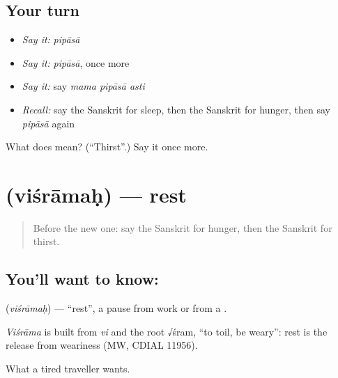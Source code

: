 \subsection*{Your turn}
\begin{itemize}
\raggedright
  \item \emph{Say it:} \emph{pipāsā}
  \item \emph{Say it:} \emph{pipāsā}, once more
  \item \emph{Say it:} say \emph{mama pipāsā asti}
  \item \emph{Recall:} say the Sanskrit for sleep, then the Sanskrit for hunger, then say \emph{pipāsā} again
\end{itemize}

\begin{tcolorbox}[breakable,colback=teal!4,colframe=teal!35!black,title={Before you move on}]
What does  mean? (\textquotedblleft{}Thirst\textquotedblright{}.) Say it once more.
\end{tcolorbox}
\section[\texorpdfstring{\sk{विश्रामः} (viśrāmaḥ)}{विश्रामः (viśrāmaḥ)}]{ (viśrāmaḥ) — rest}

\label{lesson:SA-C67-rest}



\begin{quote}
Before the new one: say the Sanskrit for hunger, then the Sanskrit for thirst.
\end{quote}

\subsection*{You'll want to know: }
\textbf{} (\emph{viśrāmaḥ}) — \textquotedblleft{}rest\textquotedblright{}, a pause from work or from a \textbf{}.

\begin{cousinweb}
\emph{Viśrāma} is built from \emph{vi} and the root √śram, \textquotedblleft{}to toil, be weary\textquotedblright{}: rest is the release from weariness (MW, CDIAL 11956).
\end{cousinweb}

\begin{grammarlens}[title={What you've built}]
What a tired traveller wants.
\end{grammarlens}

